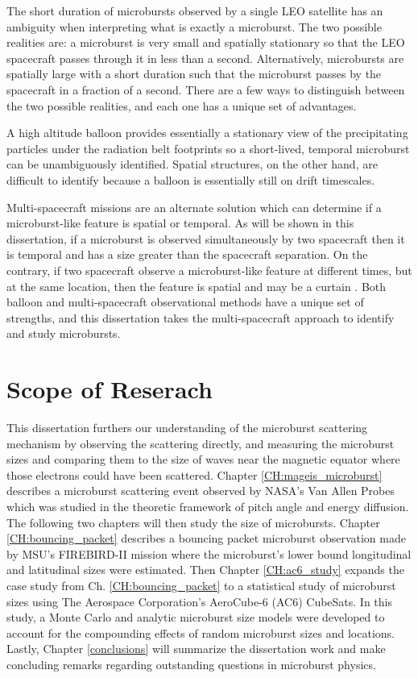 The short duration of microbursts observed by a single LEO satellite has an ambiguity when interpreting what is exactly a microburst. The two possible realities are: a microburst is very small and spatially stationary so that the LEO spacecraft passes through it in less than a second. Alternatively, microbursts are spatially large with a short duration such that the microburst passes by the spacecraft in a fraction of a second. There are a few ways to distinguish between the two possible realities, and each one has a unique set of advantages.

A high altitude balloon provides essentially a stationary view of the precipitating particles under the radiation belt footprints so a short-lived, temporal microburst can be unambiguously identified. Spatial structures, on the other hand, are difficult to identify because a balloon is essentially still on drift timescales.

Multi-spacecraft missions are an alternate solution which can determine if a microburst-like feature is spatial or temporal. As will be shown in this dissertation, if a microburst is observed simultaneously by two spacecraft then it is temporal and has a size greater than the spacecraft separation. On the contrary, if two spacecraft observe a microburst-like feature at different times, but at the same location, then the feature is spatial and may be a curtain \citep{Blake2016}. Both balloon and multi-spacecraft observational methods have a unique set of strengths, and this dissertation takes the multi-spacecraft approach to identify and study microbursts.


\section{Scope of Reserach}\label{Intro:scope}
This dissertation furthers our understanding of the microburst scattering mechanism by observing the scattering directly, and measuring the microburst sizes and comparing them to the size of waves near the magnetic equator where those electrons could have been scattered. Chapter \ref{CH:mageis_microburst} describes a microburst scattering event observed by NASA's Van Allen Probes which was studied in the theoretic framework of pitch angle and energy diffusion. The following two chapters will then study the size of microbursts. Chapter \ref{CH:bouncing_packet} describes a bouncing packet microburst observation made by MSU's FIREBIRD-II mission where the microburst's lower bound longitudinal and latitudinal sizes were estimated. Then Chapter \ref{CH:ac6_study} expands the case study from Ch. \ref{CH:bouncing_packet} to a statistical study of microburst sizes using The Aerospace Corporation's AeroCube-6 (AC6) CubeSats. In this study, a Monte Carlo and analytic microburst size models were developed to account for the compounding effects of random microburst sizes and locations. Lastly, Chapter \ref{conclusions} will summarize the dissertation work and make concluding remarks regarding outstanding questions in microburst physics.